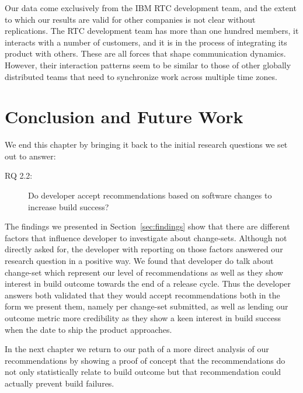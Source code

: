 Our data come exclusively from the IBM RTC development team, and the extent to which our results are valid for other companies is not clear without replications. 
The RTC development team has more than one hundred members, it interacts with a number of customers, and it is in the process of integrating its product with others.
These are all forces that shape communication dynamics. 
However, their interaction patterns seem to be similar to those of other globally distributed teams that need to synchronize work across multiple time zones.

\section{Conclusion and Future Work}
\label{sec:conclusions}
We end this chapter by bringing it back to the initial research questions we set out to answer:
\begin{description}
  \item[RQ 2.2:] Do developer accept recommendations based on software changes to increase build success? 
\end{description}

The findings we presented in Section~\ref{sec:findings} show that there are different factors that influence developer to investigate about change-sets.
Although not directly asked for, the developer with reporting on those factors answered our research question in a positive way.
We found that developer do talk about change-set which represent our level of recommendations as well as they show interest in build outcome towards the end of a release cycle.
Thus the developer answers both validated that they would accept recommendations both in the form we present them, namely per change-set submitted, as well as lending our outcome metric more credibility as they show a keen interest in build success when the date to ship the product approaches.

In the next chapter we return to our path of a more direct analysis of our recommendations by showing a proof of concept that the recommendations do not only statistically relate to build outcome but that recommendation could actually prevent build failures.